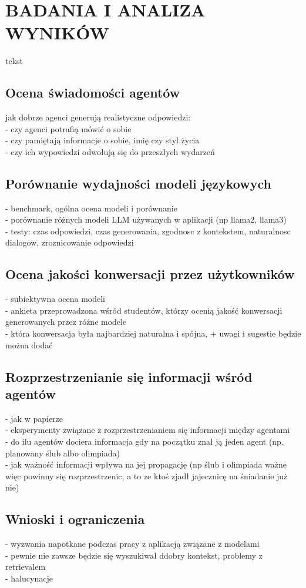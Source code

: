 \chapter{BADANIA I ANALIZA WYNIKÓW}

tekst


\section{Ocena świadomości agentów}

jak dobrze agenci generują realistyczne odpowiedzi:\\
- czy agenci potrafią mówić o sobie\\
- czy pamiętają informacje o sobie, imię czy styl życia\\
- czy ich wypowiedzi odwołują się do przeszłych wydarzeń\\


\section{Porównanie wydajności modeli językowych}

- benchmark, ogólna ocena modeli i porównanie\\
- porównanie różnych modeli LLM używanych w aplikacji (np llama2, llama3)\\
- testy: czas odpowiedzi, czas generowania, zgodnosc z kontekstem, naturalnosc dialogow, zroznicowanie odpowiedzi


\section{Ocena jakości konwersacji przez użytkowników}

- subiektywna ocena modeli\\
- ankieta przeprowadzona wśród studentów, którzy ocenią jakość konwersacji generowanych przez różne modele\\
- która konwersacja była najbardziej naturalna i spójna, + uwagi i sugestie będzie można dodać

\section{Rozprzestrzenianie się informacji wśród agentów}

- jak w papierze\\
- eksperymenty związane z rozprzestrzenianiem się informacji między agentami\\
- do ilu agentów dociera informacja gdy na początku znał ją jeden agent (np. planowany ślub albo olimpiada)\\
- jak ważność informacji wpływa na jej propagację (np ślub i olimpiada ważne więc powinny się rozprzestrzenic, a to ze ktoś zjadł jajecznicę na śniadanie już nie)


\section{Wnioski i ograniczenia}

- wyzwania napotkane podczas pracy z aplikacją związane z modelami\\
- pewnie nie zawsze będzie się wyszukiwał ddobry kontekst, problemy z retrievalem\\
- halucynacje

